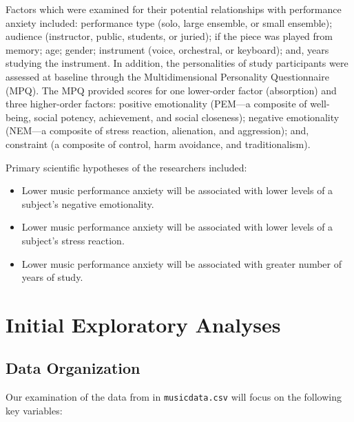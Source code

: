 \documentclass[
]{krantz}
\providecommand{\tightlist}{%
  \setlength{\itemsep}{0pt}\setlength{\parskip}{0pt}}
\begin{document}
Factors which were examined for their potential relationships with performance anxiety included: performance type (solo, large ensemble, or small ensemble); audience (instructor, public, students, or juried); if the piece was played from memory; age; gender; instrument (voice, orchestral, or keyboard); and, years studying the instrument. In addition, the personalities of study participants were assessed at baseline through the Multidimensional Personality Questionnaire (MPQ). The MPQ provided scores for one lower-order factor (absorption) and three higher-order factors: positive emotionality (PEM---a composite of well-being, social potency, achievement, and social closeness); negative emotionality (NEM---a composite of stress reaction, alienation, and aggression); and, constraint (a composite of control, harm avoidance, and traditionalism).

Primary scientific hypotheses of the researchers included:

\begin{itemize}
\tightlist
\item
  Lower music performance anxiety will be associated with lower levels of a subject's negative emotionality.
\item
  Lower music performance anxiety will be associated with lower levels of a subject's stress reaction.
\item
  Lower music performance anxiety will be associated with greater number of years of study.
\end{itemize}

\hypertarget{explore}{%
\section{Initial Exploratory Analyses}\label{explore}}

\hypertarget{organizedata1}{%
\subsection{Data Organization}\label{organizedata1}}

Our examination of the data from \citet{Miller2010} in \texttt{musicdata.csv} will focus on the following key variables:
\end{document}
